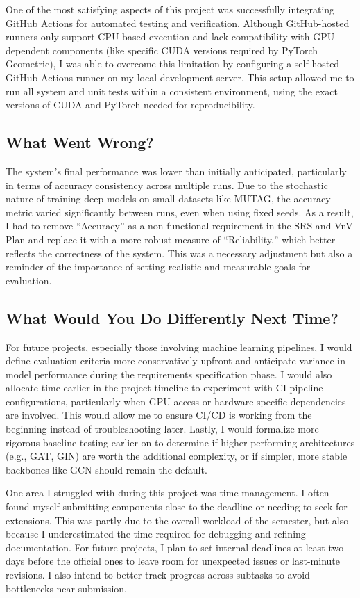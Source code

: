 \documentclass{article}
\begin{document}
One of the most satisfying aspects of this project was successfully integrating GitHub Actions for automated testing and verification. Although GitHub-hosted runners only support CPU-based execution and lack compatibility with GPU-dependent components (like specific CUDA versions required by PyTorch Geometric), I was able to overcome this limitation by configuring a self-hosted GitHub Actions runner on my local development server. This setup allowed me to run all system and unit tests within a consistent environment, using the exact versions of CUDA and PyTorch needed for reproducibility.

\subsection{What Went Wrong?}

The system’s final performance was lower than initially anticipated, particularly in terms of accuracy consistency across multiple runs. Due to the stochastic nature of training deep models on small datasets like MUTAG, the accuracy metric varied significantly between runs, even when using fixed seeds. As a result, I had to remove “Accuracy” as a non-functional requirement in the SRS and VnV Plan and replace it with a more robust measure of “Reliability,” which better reflects the correctness of the system. This was a necessary adjustment but also a reminder of the importance of setting realistic and measurable goals for evaluation.

\subsection{What Would You Do Differently Next Time?}

For future projects, especially those involving machine learning pipelines, I would define evaluation criteria more conservatively upfront and anticipate variance in model performance during the requirements specification phase. I would also allocate time earlier in the project timeline to experiment with CI pipeline configurations, particularly when GPU access or hardware-specific dependencies are involved. This would allow me to ensure CI/CD is working from the beginning instead of troubleshooting later. Lastly, I would formalize more rigorous baseline testing earlier on to determine if higher-performing architectures (e.g., GAT, GIN) are worth the additional complexity, or if simpler, more stable backbones like GCN should remain the default.

One area I struggled with during this project was time management. I often found myself submitting components close to the deadline or needing to seek for extensions. This was partly due to the overall workload of the semester, but also because I underestimated the time required for debugging and refining documentation. For future projects, I plan to set internal deadlines at least two days before the official ones to leave room for unexpected issues or last-minute revisions. I also intend to better track progress across subtasks to avoid bottlenecks near submission.
\end{document}
